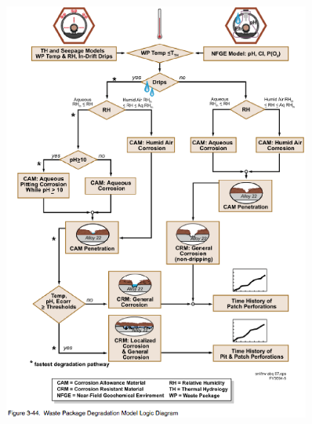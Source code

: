 \begin{frame}[ctb!]
\begin{minipage}{0.49\textwidth}
\begin{figure}[h!]
        \includegraphics[width=0.9\textwidth]{model.eps}
    \end{figure}
  \end{minipage}
  

\end{frame}
